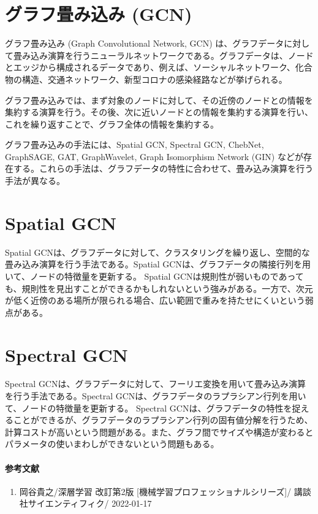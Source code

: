 \documentclass{ltjsarticle}
\begin{document}
\clearpage
\section{グラフ畳み込み (GCN)}
グラフ畳み込み (Graph Convolutional Network, GCN) は、グラフデータに対して畳み込み演算を行うニューラルネットワークである。グラフデータは、ノードとエッジから構成されるデータであり、例えば、ソーシャルネットワーク、化合物の構造、交通ネットワーク、新型コロナの感染経路などが挙げられる。
\par
グラフ畳み込みでは、まず対象のノードに対して、その近傍のノードとの情報を集約する演算を行う。その後、次に近いノードとの情報を集約する演算を行い、これを繰り返すことで、グラフ全体の情報を集約する。
\par
グラフ畳み込みの手法には、Spatial GCN, Spectral GCN, ChebNet, GraphSAGE, GAT, GraphWavelet, Graph Isomorphism Network (GIN) などが存在する。これらの手法は、グラフデータの特性に合わせて、畳み込み演算を行う手法が異なる。

\clearpage
\section{Spatial GCN}
Spatial GCNは、グラフデータに対して、クラスタリングを繰り返し、空間的な畳み込み演算を行う手法である。Spatial GCNは、グラフデータの隣接行列を用いて、ノードの特徴量を更新する。
Spatial GCNは規則性が弱いものであっても、規則性を見出すことができるかもしれないという強みがある。一方で、次元が低く近傍のある場所が限られる場合、広い範囲で重みを持たせにくいという弱点がある。

\clearpage
\section{Spectral GCN}
Spectral GCNは、グラフデータに対して、フーリエ変換を用いて畳み込み演算を行う手法である。Spectral GCNは、グラフデータのラプラシアン行列を用いて、ノードの特徴量を更新する。
Spectral GCNは、グラフデータの特性を捉えることができるが、グラフデータのラプラシアン行列の固有値分解を行うため、計算コストが高いという問題がある。また、グラフ間でサイズや構造が変わるとパラメータの使いまわしができないという問題もある。


\clearpage
\paragraph{参考文献}
\begin{enumerate}
  \item 岡谷貴之/深層学習 改訂第2版 [機械学習プロフェッショナルシリーズ]/ 講談社サイエンティフィク/ 2022-01-17
\end{enumerate}

\newpage
\end{document}
